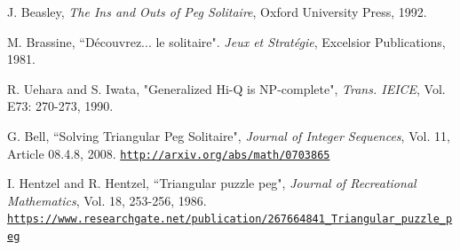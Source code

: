 \documentclass{article}
\begin{document}
\newpage
\begin{thebibliography}{mybib} 

 J. Beasley, \textit{The Ins and Outs of Peg Solitaire}, Oxford University Press, 1992.

 M. Brassine, ``D\'ecouvrez... le solitaire". \textit{Jeux et Strat\'egie}, Excelsior Publications, 1981.

 R. Uehara and S. Iwata, "Generalized Hi-Q is NP-complete", \textit{Trans. IEICE}, Vol. E73: 270-273, 1990.

 G. Bell, ``Solving Triangular Peg Solitaire", \textit{Journal of Integer Sequences}, Vol. 11, Article 08.4.8, 2008.\newline
\href{http://arxiv.org/abs/math/0703865}{\tt http://arxiv.org/abs/math/0703865}

 I. Hentzel and R. Hentzel, ``Triangular puzzle peg", \textit{Journal of Recreational Mathematics}, Vol. 18, 253-256, 1986.\newline
\href{https://www.researchgate.net/publication/267664841_Triangular_puzzle_peg}
{\tt https://www.researchgate.net/publication/267664841_Triangular_puzzle_peg}

\end{thebibliography}
\end{document}
